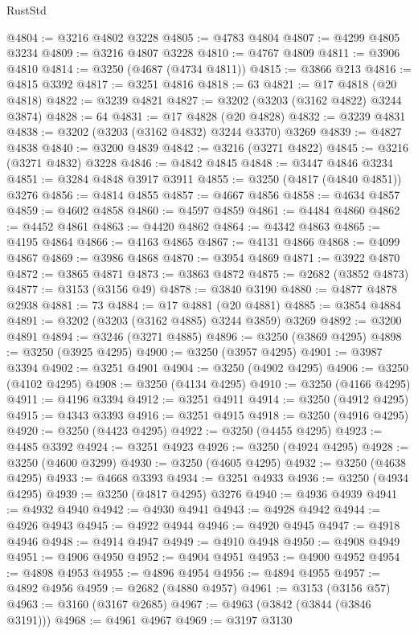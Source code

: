\begin{lexlean}{RustStd}
\begin{coremodule}
@4804 := @3216 @4802 @3228
@4805 := @4783 @4804
@4807 := @4299 @4805 @3234
@4809 := @3216 @4807 @3228
@4810 := @4767 @4809
@4811 := @3906 @4810
@4814 := @3250 (@4687 (@4734 @4811))
@4815 := @3866 @213
@4816 := @4815 @3392
@4817 := @3251 @4816
@4818 := 63
@4821 := @17 @4818 (@20 @4818)
@4822 := @3239 @4821
@4827 := @3202 (@3203 (@3162 @4822) @3244 @3874)
@4828 := 64
@4831 := @17 @4828 (@20 @4828)
@4832 := @3239 @4831
@4838 := @3202 (@3203 (@3162 @4832) @3244 @3370) @3269
@4839 := @4827 @4838
@4840 := @3200 @4839
@4842 := @3216 (@3271 @4822)
@4845 := @3216 (@3271 @4832) @3228
@4846 := @4842 @4845
@4848 := @3447 @4846 @3234
@4851 := @3284 @4848 @3917 @3911
@4855 := @3250 (@4817 (@4840 @4851)) @3276
@4856 := @4814 @4855
@4857 := @4667 @4856
@4858 := @4634 @4857
@4859 := @4602 @4858
@4860 := @4597 @4859
@4861 := @4484 @4860
@4862 := @4452 @4861
@4863 := @4420 @4862
@4864 := @4342 @4863
@4865 := @4195 @4864
@4866 := @4163 @4865
@4867 := @4131 @4866
@4868 := @4099 @4867
@4869 := @3986 @4868
@4870 := @3954 @4869
@4871 := @3922 @4870
@4872 := @3865 @4871
@4873 := @3863 @4872
@4875 := @2682 (@3852 @4873)
@4877 := @3153 (@3156 @49)
@4878 := @3840 @3190
@4880 := @4877 @4878 @2938
@4881 := 73
@4884 := @17 @4881 (@20 @4881)
@4885 := @3854 @4884
@4891 := @3202 (@3203 (@3162 @4885) @3244 @3859) @3269
@4892 := @3200 @4891
@4894 := @3246 (@3271 @4885)
@4896 := @3250 (@3869 @4295)
@4898 := @3250 (@3925 @4295)
@4900 := @3250 (@3957 @4295)
@4901 := @3987 @3394
@4902 := @3251 @4901
@4904 := @3250 (@4902 @4295)
@4906 := @3250 (@4102 @4295)
@4908 := @3250 (@4134 @4295)
@4910 := @3250 (@4166 @4295)
@4911 := @4196 @3394
@4912 := @3251 @4911
@4914 := @3250 (@4912 @4295)
@4915 := @4343 @3393
@4916 := @3251 @4915
@4918 := @3250 (@4916 @4295)
@4920 := @3250 (@4423 @4295)
@4922 := @3250 (@4455 @4295)
@4923 := @4485 @3392
@4924 := @3251 @4923
@4926 := @3250 (@4924 @4295)
@4928 := @3250 (@4600 @3299)
@4930 := @3250 (@4605 @4295)
@4932 := @3250 (@4638 @4295)
@4933 := @4668 @3393
@4934 := @3251 @4933
@4936 := @3250 (@4934 @4295)
@4939 := @3250 (@4817 @4295) @3276
@4940 := @4936 @4939
@4941 := @4932 @4940
@4942 := @4930 @4941
@4943 := @4928 @4942
@4944 := @4926 @4943
@4945 := @4922 @4944
@4946 := @4920 @4945
@4947 := @4918 @4946
@4948 := @4914 @4947
@4949 := @4910 @4948
@4950 := @4908 @4949
@4951 := @4906 @4950
@4952 := @4904 @4951
@4953 := @4900 @4952
@4954 := @4898 @4953
@4955 := @4896 @4954
@4956 := @4894 @4955
@4957 := @4892 @4956
@4959 := @2682 (@4880 @4957)
@4961 := @3153 (@3156 @57)
@4963 := @3160 (@3167 @2685)
@4967 := @4963 (@3842 (@3844 (@3846 @3191)))
@4968 := @4961 @4967
@4969 := @3197 @3130

\end{coremodule}
\end{lexlean}

